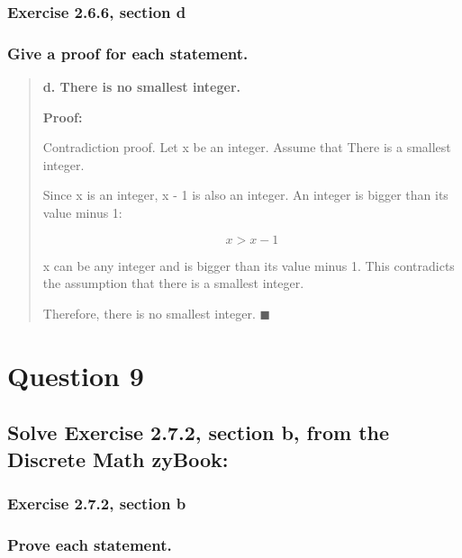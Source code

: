 \documentclass[11pt, oneside]{article}
\begin{document}
\subsubsection*{Exercise 2.6.6, section d}

\subsubsection*{Give a proof for each statement.}

\begin{quote}
    \textbf{d. There is no smallest integer.}
    
    \textbf{Proof:}
    
    Contradiction proof. Let x be an integer. Assume that There is a smallest integer.
    
    Since x is an integer, x - 1 is also an integer. An integer is bigger than its value minus 1:
    
    \[x > x - 1\]
    
    x can be any integer and is bigger than its value minus 1. This contradicts the assumption that there is a smallest integer.
    
    Therefore, there is no smallest integer. $\blacksquare$
\end{quote}

\pagebreak

\section*{Question 9}

\subsection*{Solve Exercise 2.7.2, section b, from the Discrete Math zyBook:}

\subsubsection*{Exercise 2.7.2, section b}

\subsubsection*{Prove each statement.}
\end{document}
